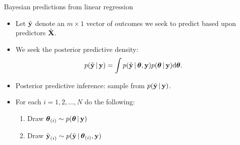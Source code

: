 \begin{frame}{Bayesian predictions from linear regression}
 
 \begin{itemize}\setlength{\itemsep}{0.4cm}
  \item Let $\tilde{\textbf{y}}$ denote an $m\times 1$ vector of outcomes we seek to predict based upon predictors $\tilde{\textbf{X}}$.
  \item We seek the posterior predictive density:
\[
 p(\tilde{\textbf{y}}\,|\, \textbf{y}) = \int p(\tilde{\textbf{y}}\,|\, \mbox{\boldmath $ \theta $}, \textbf{y}) p(\mbox{\boldmath $ \theta $}\,|\, \textbf{y}) \mbox{d}\mbox{\boldmath $ \theta $} .
\]
  \item Posterior predictive inference: sample from $p(\tilde{\textbf{y}}\,|\, \textbf{y})$.
  \item For each $i=1,2,\ldots,N$ do the following: 
 \begin{enumerate}\setlength{\itemsep}{0.25cm}
  \item Draw $\displaystyle \mbox{\boldmath $ \theta $}_{(i)} \sim p(\mbox{\boldmath $ \theta $}\,|\, \textbf{y})$
  \item Draw $\displaystyle \tilde{\textbf{y}}_{(i)} \sim p(\tilde{\textbf{y}}\,|\, \mbox{\boldmath $ \theta $}_{(i)},\textbf{y})$
 \end{enumerate}
  
 \end{itemize}

\end{frame}

